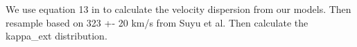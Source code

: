 We use equation 13 in \citet{Suyu13} to calculate the velocity dispersion from our models. Then resample based on 323 +- 20 km/s from Suyu et al. Then calculate the kappa_ext distribution. 